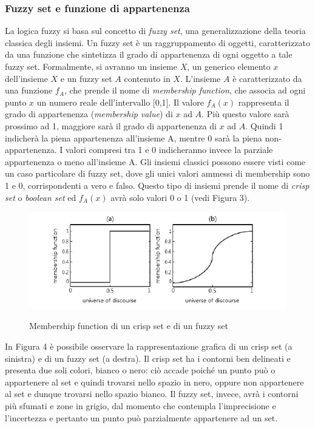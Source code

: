 \documentclass[11pt]{article}
\begin{document}
\subsubsection{Fuzzy set e funzione di appartenenza}
La logica fuzzy si basa sul concetto di \textit{fuzzy set}, una generalizzazione della teoria classica degli insiemi. Un fuzzy set è un raggruppamento di oggetti, caratterizzato da una funzione che sintetizza il grado di appartenenza di ogni oggetto a tale fuzzy set. Formalmente, si avranno un insieme $X$, un generico elemento $x$  dell'insieme $X$ e un fuzzy set $A$ contenuto in $X$. L'insieme $A$ è caratterizzato da una funzione $f_A$, che prende il nome di \textit{membership function}, che associa ad ogni punto $x$ un numero reale dell'intervallo [0,1]. Il valore $f_A(x)$ rappresenta il grado di appartenenza (\textit {membership value}) di $x$ ad $A$. Più questo valore sarà prossimo ad 1, maggiore sarà il grado di appartenenza di $x$ ad $A$. Quindi 1 indicherà la piena appartenenza all'insieme A, mentre 0 sarà la piena non-appartenenza. I valori compresi tra 1 e 0 indicheranno invece la parziale appartenenza o meno all'insieme A. Gli insiemi classici possono essere visti come un caso particolare di fuzzy set, dove gli unici valori ammessi di membership sono 1 e 0, corrispondenti a vero e falso. Questo tipo di insiemi prende il nome di \textit{crisp set} o \textit{boolean set} ed $f_A(x)$ avrà solo valori 0 o 1 (vedi Figura 3). 


\begin{figure}[h!]
\begin{center}
  \includegraphics[width=13cm]{Immagini/membfunctcrispvsfuzzy.png}\\
  \caption{Membership function di un crisp set e di un fuzzy set}
\end{center}
\end{figure}

In Figura 4 è possibile osservare la rappresentazione grafica di un crisp set (a sinistra) e di un fuzzy set (a destra). Il crisp set ha i contorni ben delineati e presenta due soli colori, bianco o nero: ciò accade poiché un punto può o appartenere al set e quindi trovarsi nello spazio in nero, oppure non appartenere al set e dunque trovarsi nello spazio bianco. Il fuzzy set, invece, avrà i contorni più sfumati e zone in grigio, dal momento che contempla l'imprecisione e l'incertezza e pertanto un punto può parzialmente appartenere ad un set. 
\end{document}
